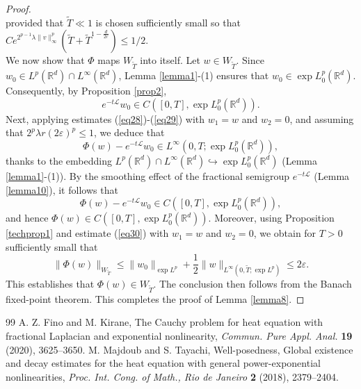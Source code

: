 \documentclass[10pt,a4paper]{amsart}
\begin{document}
\begin{proof}
\begin{equation}
\end{equation}
provided that $\widetilde{T}\ll1$ is chosen sufficiently small so that $Ce^{2^{p-1}\lambda\|v\|_\infty^p}\left(\widetilde{T}+\widetilde{T}^{1-\frac{d}{2 r}}\right)\leq 1/2$.\\
We now show that $\Phi$ maps $W_{\widetilde{T}}$ into itself. Let $w\in W_{\widetilde{T}}$. Since $w_0\in L^p(\mathbb{R}^d)\cap L^\infty(\mathbb{R}^d)$, Lemma \ref{lemma1}-(1) ensures that $w_0\in\exp L^p_0(\mathbb{R}^d)$. Consequently, by Proposition \ref{prop2}, 
$$e^{-t\mathcal{L}}w_0\in C([0,T],\exp L^p_0(\mathbb{R}^d)).$$ 
Next, applying estimates (\ref{eq28})-(\ref{eq29}) with $w_1=w$ and $w_2=0$, and assuming that $2^p\lambda r (2\varepsilon)^p\leq1$, we deduce that
$$\Phi(w)-e^{-t\mathcal{L}}w_0\in L^\infty(0,T;\exp L^p_0(\mathbb{R}^d)),$$
thanks to the embedding $L^p(\mathbb{R}^d)\cap L^\infty(\mathbb{R}^d)\hookrightarrow \exp L^p_0(\mathbb{R}^d)$ (Lemma \ref{lemma1}-(1)). By the smoothing effect of the fractional semigroup $e^{-t\mathcal{L}}$ (Lemma \ref{lemma10}), it follows that 
$$\Phi(w)-e^{-t\mathcal{L}}w_0\in C([0,T],\exp L^p_0(\mathbb{R}^d)),$$
and hence $\Phi(w)\in C([0,T],\exp L^p_0(\mathbb{R}^d))$.  Moreover, using Proposition \ref{techprop1} and estimate (\ref{eq30}) with $w_1=w$ and $w_2=0$, we obtain for $T>0$ sufficiently small that 
$$\|\Phi(w)\|_{W_{\widetilde{T}}}\leq \|w_0\|_{\exp L^p} +\frac{1}{2}\|w\|_{L^\infty(0,\widetilde{T};\exp L^p)}\leq 2\varepsilon.$$
This establishes that $\Phi(w)\in W_{\widetilde{T}}$. The conclusion then follows from the Banach fixed-point theorem. This completes the proof of Lemma \ref{lemma8}.
\end{proof}

\begin{thebibliography}{99}
 A. Z. Fino and M. Kirane, The Cauchy problem for heat equation with fractional Laplacian and exponential nonlinearity, \emph{Commun. Pure Appl. Anal.} \textbf{19} (2020), 3625--3650.
 \newblock M. Majdoub and S. Tayachi, \newblock Well-posedness, Global existence and decay estimates for the heat equation with general power-exponential nonlinearities, \newblock \emph{Proc. Int. Cong. of Math., Rio de Janeiro} \textbf{2} (2018), 2379--2404.
\end{thebibliography}
\end{document}
